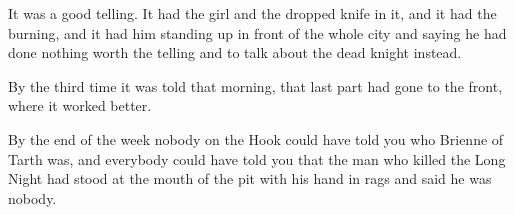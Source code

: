 It was a good telling. It had the girl and the dropped knife in it, and it had the burning, and it had him standing up in front of the whole city and saying he had done nothing worth the telling and to talk about the dead knight instead.

By the third time it was told that morning, that last part had gone to the front, where it worked better.

By the end of the week nobody on the Hook could have told you who Brienne of Tarth was, and everybody could have told you that the man who killed the Long Night had stood at the mouth of the pit with his hand in rags and said he was nobody.